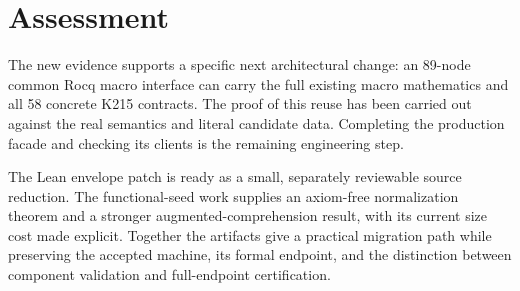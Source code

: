 \documentclass[11pt,letterpaper]{article}
\theoremstyle{definition}\newtheorem{definition}[theorem]{Definition}
\theoremstyle{remark}\newtheorem{remark}[theorem]{Remark}
\begin{document}
\section{Assessment}

The new evidence supports a specific next architectural change: an 89-node common Rocq macro interface can carry the full existing macro mathematics and all 58 concrete K215 contracts. The proof of this reuse has been carried out against the real semantics and literal candidate data. Completing the production facade and checking its clients is the remaining engineering step.

The Lean envelope patch is ready as a small, separately reviewable source reduction. The functional-seed work supplies an axiom-free normalization theorem and a stronger augmented-comprehension result, with its current size cost made explicit. Together the artifacts give a practical migration path while preserving the accepted machine, its formal endpoint, and the distinction between component validation and full-endpoint certification.
\end{document}
